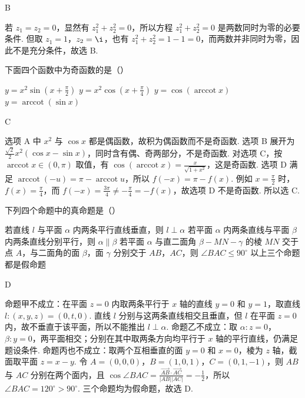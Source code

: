 \documentclass[UTF8,a4paper,oneside,11pt]{ctexbook}
\begin{document}
\begin{answer}
B
\end{answer}

\begin{solution}
若 \(z_1=z_2=0\)，显然有 \(z_1^2+z_2^2=0\)，所以方程 \(z_1^2+z_2^2=0\) 是两数同时为零的必要条件. 但取 \(z_1=1\)，\(z_2=\i\)，也有 \(z_1^2+z_2^2=1-1=0\)，而两数并非同时为零，因此不是充分条件，故选 B.
\end{solution}

\begin{problem}
下面四个函数中为奇函数的是（\quad）

\choices
    {\(y=x^2\sin\left( x+\frac{\pi}{2} \right)\)}
    {\(y=x^2\cos\left( x+\frac{\pi}{4} \right)\)}
    {\(y=\cos(\operatorname{arccot} x)\)}
    {\(y=\operatorname{arccot}(\sin x)\)}
\end{problem}

\begin{answer}
C
\end{answer}

\begin{solution}
选项 A 中 \(x^2\) 与 \(\cos x\) 都是偶函数，故积为偶函数而不是奇函数. 选项 B 展开为 \(\frac{\sqrt{2}}{2}x^2(\cos x-\sin x)\)，同时含有偶、奇两部分，不是奇函数. 对选项 C，按 \(\operatorname{arccot}x\in(0,\pi)\) 取值，有 \(\cos(\operatorname{arccot}x)=\frac{x}{\sqrt{1+x^2}}\)，这是奇函数. 选项 D 满足 \(\operatorname{arccot}(-u)=\pi-\operatorname{arccot}u\)，所以 \(f(-x)=\pi-f(x)\). 例如 \(x=\frac{\pi}{2}\) 时，\(f(x)=\frac{\pi}{4}\)，而 \(f(-x)=\frac{3\pi}{4}\ne-\frac{\pi}{4}=-f(x)\)，故选项 D 不是奇函数. 所以选 C.
\end{solution}

\begin{problem}
下列四个命题中的真命题是（\quad）

\choices
    {若直线 \(l\) 与平面 \(\alpha\) 内两条平行直线垂直，则 \(l\perp \alpha\)}
    {若平面 \(\alpha\) 内两条直线与平面 \(\beta\) 内两条直线分别平行，则 \(\alpha\parallel \beta\)}
    {若平面 \(\alpha\) 与直二面角 \(\beta-MN-\gamma\) 的棱 \(MN\) 交于点 \(A\)，与二面角的面 \(\beta\)，面 \(\gamma\) 分别交于 \(AB\)，\(AC\)，则 \(\angle BAC\leqslant 90^\circ\)}
    {以上三个命题都是假命题}
\end{problem}

\begin{answer}
D
\end{answer}

\begin{solution}
命题甲不成立：在平面 \(z=0\) 内取两条平行于 \(x\) 轴的直线 \(y=0\) 和 \(y=1\)，取直线 \(l:(x,y,z)=(0,t,0)\). 直线 \(l\) 分别与这两条直线相交且垂直，但 \(l\) 在平面 \(z=0\) 内，故不垂直于该平面，所以不能推出 \(l\perp\alpha\). 命题乙不成立：取 \(\alpha:z=0\)，\(\beta:y=0\)，两平面相交；分别在其中取两条方向均平行于 \(x\) 轴的平行直线，仍满足题设条件. 命题丙也不成立：取两个互相垂直的面 \(y=0\) 和 \(x=0\)，棱为 \(z\) 轴，截面取平面 \(z=x-y\). 令 \(A=(0,0,0)\)，\(B=(1,0,1)\)，\(C=(0,1,-1)\)，则 \(AB\) 与 \(AC\) 分别在两个面内，且 \(\cos\angle BAC=\frac{\overrightarrow{AB}\cdot\overrightarrow{AC}}{|AB||AC|}=-\frac{1}{2}\)，所以 \(\angle BAC=120^\circ>90^\circ\). 三个命题均为假命题，故选 D.
\end{solution}
\end{document}
